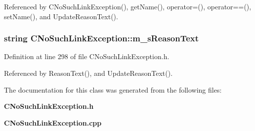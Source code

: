 Referenced by CNo\-Such\-Link\-Exception(), get\-Name(), operator=(), operator==(), set\-Name(), and Update\-Reason\-Text().
\subsubsection{\setlength{\rightskip}{0pt plus 5cm}string CNo\-Such\-Link\-Exception::m\_\-s\-Reason\-Text\hspace{0.3cm}{\tt  [private]}}\label{classCNoSuchLinkException_o3}




Definition at line 298 of file CNo\-Such\-Link\-Exception.h.

Referenced by Reason\-Text(), and Update\-Reason\-Text().

The documentation for this class was generated from the following files:\begin{CompactItemize}
\item 
{\bf CNo\-Such\-Link\-Exception.h}\item 
{\bf CNo\-Such\-Link\-Exception.cpp}\end{CompactItemize}
